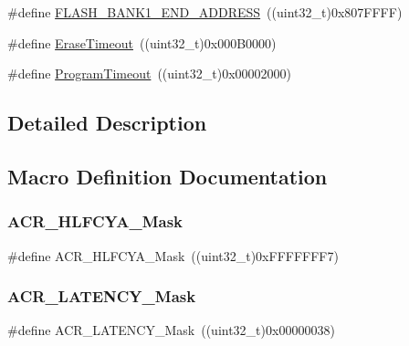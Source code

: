 \begin{DoxyCompactItemize}
\item 
\#define \mbox{\hyperlink{group___f_l_a_s_h___private___defines_ga54cf78f1be63ba209709bf8f781ccd01}{F\+L\+A\+S\+H\+\_\+\+B\+A\+N\+K1\+\_\+\+E\+N\+D\+\_\+\+A\+D\+D\+R\+E\+SS}}~((uint32\+\_\+t)0x807\+F\+F\+F\+F)
\item 
\#define \mbox{\hyperlink{group___f_l_a_s_h___private___defines_ga62b5515e9a29a487adcc30a88d082244}{Erase\+Timeout}}~((uint32\+\_\+t)0x000\+B0000)
\item 
\#define \mbox{\hyperlink{group___f_l_a_s_h___private___defines_ga0794a43966b6084d28d13c651c739385}{Program\+Timeout}}~((uint32\+\_\+t)0x00002000)
\end{DoxyCompactItemize}


\subsection{Detailed Description}


\subsection{Macro Definition Documentation}
\mbox{\label{group___f_l_a_s_h___private___defines_ga6b6f73163f3a90f5072b6b7dc9fb63b7}} 
\subsubsection{\texorpdfstring{ACR\_HLFCYA\_Mask}{ACR\_HLFCYA\_Mask}}
{\footnotesize\ttfamily \#define A\+C\+R\+\_\+\+H\+L\+F\+C\+Y\+A\+\_\+\+Mask~((uint32\+\_\+t)0x\+F\+F\+F\+F\+F\+F\+F7)}

\mbox{\label{group___f_l_a_s_h___private___defines_ga5f1112c5731f01b063fdf2461efbedf7}} 
\subsubsection{\texorpdfstring{ACR\_LATENCY\_Mask}{ACR\_LATENCY\_Mask}}
{\footnotesize\ttfamily \#define A\+C\+R\+\_\+\+L\+A\+T\+E\+N\+C\+Y\+\_\+\+Mask~((uint32\+\_\+t)0x00000038)}

